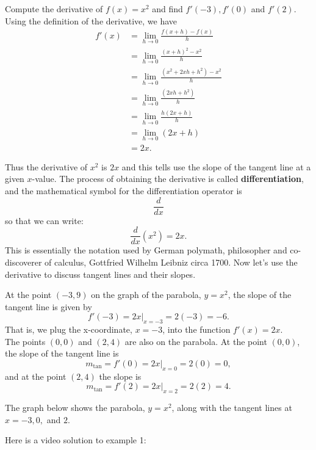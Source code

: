 \documentclass[handout]{ximera}
\begin{document}
\begin{example}[example 1]
Compute the derivative of $f(x) = x^2$ and find $f'(-3), f'(0)$ and $f'(2)$.
Using the definition of the derivative, we have
\begin{align*}
f'(x) &= \lim_{h \to 0} \frac{f(x+h)-f(x)}{h}\\[5pt] 
&= \lim_{h \to 0} \frac{(x+h)^2- x^2}{h}\\[5pt] 
&= \lim_{h \to 0} \frac{(x^2 + 2xh + h^2)- x^2}{h} \\[5pt] 
&=  \lim_{h \to 0} \frac{ (2xh + h^2)}{h}\\[5pt] 
&=  \lim_{h \to 0} \frac{ h(2x + h)}{h}\\[5pt] 
&=  \lim_{h \to 0} (2x + h)\\
&= 2x.
\end{align*}

Thus the derivative of $x^2$ is $2x$ and this tells use the slope of the tangent line at a given $x$-value.
The process of obtaining the derivative is called \textbf{differentiation},
and the mathematical symbol for the differentiation operator is
\[
\frac{d}{dx}
\]
so that we can write:
\[
\frac{d}{dx}\left( x^2\right) = 2x.
\]
This is essentially the notation used by German polymath, philosopher and co-discoverer of calculus, 
Gottfried Wilhelm Leibniz circa 1700.
Now let's use the derivative to discuss tangent lines and their slopes.

At the point $(-3, 9)$ on the graph of the parabola, $y = x^2$, the slope of the tangent line is given by 
\[
f'(-3) = 2x\big|_{x=-3} = 2(-3) = -6.
\]
That is, we plug the x-coordinate, $x=-3$, into the function $f'(x) = 2x$.\\
The points $(0,0)$ and $(2,4)$ are also on the parabola. 
At the point $(0,0)$, the slope of the tangent line is 
\[
m_{\text{tan}}= f'(0) =2x\big|_{x=0}= 2(0) = 0,
\]
 and at the point $(2, 4)$ the slope is 
\[
m_{\text{tan}}= f'(2) =2x\big|_{x=2}= 2(2) = 4.
\]

The graph below shows the parabola, $y = x^2$, along with the tangent lines at $x = -3, 0,$ and $2$.


\end{example}


Here is a video solution to example 1:
\begin{foldable}
\end{foldable}
\end{document}
